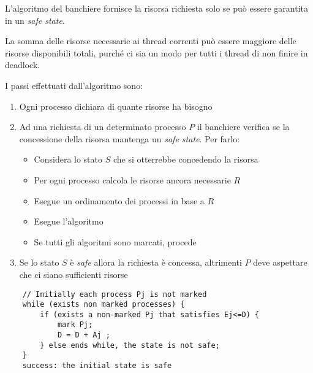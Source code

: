 L'algoritmo del banchiere fornisce la risorsa richiesta solo se può essere garantita in un \textit{safe state}.
\begin{note}
	La somma delle risorse necessarie ai thread correnti può essere maggiore delle risorse disponibili totali, purché ci sia un modo per tutti i thread di non finire in deadlock.
\end{note}
I passi effettuati dall'algoritmo sono:
\begin{enumerate}
	\item Ogni processo dichiara di quante risorse ha bisogno
	\item Ad una richiesta di un determinato processo $P$ il banchiere verifica se la concessione della risorsa mantenga un \textit{safe state}. Per farlo:
	\begin{itemize}
		\item Considera lo stato $S$ che si otterrebbe concedendo la risorsa
		\item Per ogni processo calcola le risorse ancora necessarie $R$
		\item Esegue un ordinamento dei processi in base a $R$
		\item Esegue l'algoritmo
		\item Se tutti gli algoritmi sono marcati, procede
	\end{itemize}
	\item Se lo stato $S$ è \textit{safe} allora la richiesta è concessa, altrimenti $P$ deve aspettare che ci siano sufficienti risorse
\end{enumerate}

\begin{lstlisting}
	// Initially each process Pj is not marked
	while (exists non marked processes) {
		if (exists a non-marked Pj that satisfies Ej<=D) {
			mark Pj;
			D = D + Aj ;
		} else ends while, the state is not safe;
	}
	success: the initial state is safe
\end{lstlisting}

